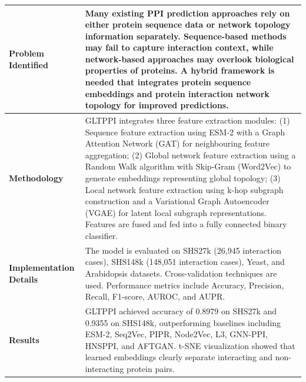 \documentclass[12pt,a4paper]{report}
\begin{document}
\begin{table}[H]
\centering
\renewcommand{\arraystretch}{1.5}
\begin{tabular}{|p{}|p{}|}
\hline
\textbf{Problem Identified} & Many existing PPI prediction approaches rely on either protein sequence data or network topology information separately. Sequence-based methods may fail to capture interaction context, while network-based approaches may overlook biological properties of proteins. A hybrid framework is needed that integrates protein sequence embeddings and protein interaction network topology for improved predictions. \\ \hline
\textbf{Methodology} & GLTPPI integrates three feature extraction modules: (1) Sequence feature extraction using ESM-2 with a Graph Attention Network (GAT) for neighbouring feature aggregation; (2) Global network feature extraction using a Random Walk algorithm with Skip-Gram (Word2Vec) to generate embeddings representing global topology; (3) Local network feature extraction using k-hop subgraph construction and a Variational Graph Autoencoder (VGAE) for latent local subgraph representations. Features are fused and fed into a fully connected binary classifier. \\ \hline
\textbf{Implementation Details} & The model is evaluated on SHS27k (26,945 interaction cases), SHS148k (148,051 interaction cases), Yeast, and Arabidopsis datasets. Cross-validation techniques are used. Performance metrics include Accuracy, Precision, Recall, F1-score, AUROC, and AUPR. \\ \hline
\textbf{Results} & GLTPPI achieved accuracy of 0.8979 on SHS27k and 0.9355 on SHS148k, outperforming baselines including ESM-2, Seq2Vec, PIPR, Node2Vec, L3, GNN-PPI, HNSPPI, and AFTGAN. t-SNE visualization showed that learned embeddings clearly separate interacting and non-interacting protein pairs. \\ \hline
\end{tabular}
\end{table}

\newpage
\end{document}
